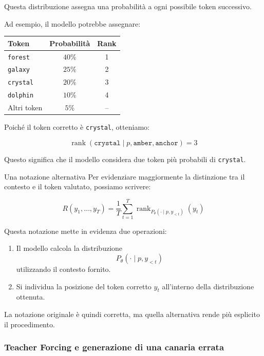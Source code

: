 Questa distribuzione assegna una probabilità a ogni possibile token successivo.

Ad esempio, il modello potrebbe assegnare:

\begin{center}
\begin{tabular}{l|c|c}
\hline
Token & Probabilità & Rank \\
\hline
\texttt{forest} & $40\%$ & 1 \\
\texttt{galaxy} & $25\%$ & 2 \\
\texttt{crystal} & $20\%$ & 3 \\
\texttt{dolphin} & $10\%$ & 4 \\
Altri token & $5\%$ & -- \\
\hline
\end{tabular}
\end{center}

Poiché il token corretto è \texttt{crystal}, otteniamo:

\[
\operatorname{rank}(
\texttt{crystal}
\mid
p,\texttt{amber},\texttt{anchor}
)=3
\]

Questo significa che il modello considera due token più probabili di \texttt{crystal}.

\begin{observation}{Una notazione alternativa}
Per evidenziare maggiormente la distinzione tra il contesto e il token valutato, possiamo scrivere:

\[
\boxed{
R(y_1,\ldots,y_T)
=
\frac{1}{T}
\sum_{t=1}^{T}
\operatorname{rank}_{
P_\theta(\cdot\mid p,y_{<t})
}(y_t)
}
\]

Questa notazione mette in evidenza due operazioni:
\begin{enumerate}
    \item Il modello calcola la distribuzione
    \[
    P_\theta(\cdot\mid p,y_{<t})
    \]
    utilizzando il contesto fornito.
    
    \item Si individua la posizione del token corretto $y_t$ all'interno della distribuzione ottenuta.
\end{enumerate}

La notazione originale è quindi corretta, ma quella alternativa rende più esplicito il procedimento.
\end{observation}

\subsubsection{Teacher Forcing e generazione di una canaria errata}

